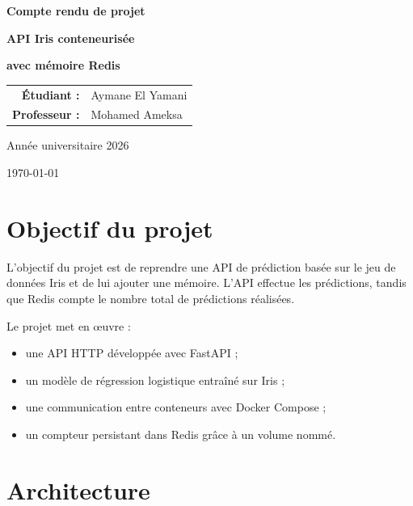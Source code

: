 \documentclass[12pt,a4paper]{article}
\begin{document}
\begin{titlepage}
  \centering
  \vspace*{2cm}

  {\Large\textbf{Compte rendu de projet}\par}
  \vspace{1.5cm}

  {\huge\bfseries API Iris conteneurisée\par}
  \vspace{0.4cm}
  {\huge\bfseries avec mémoire Redis\par}

  \vfill

  \begin{tabular}{rl}
    \textbf{Étudiant :} & Aymane El Yamani \\
    \textbf{Professeur :} & Mohamed Ameksa
  \end{tabular}

  \vfill

  {\large Année universitaire 2026\par}
  \vspace{0.5cm}
  {\large \today\par}
\end{titlepage}

\tableofcontents
\newpage

\section{Objectif du projet}

L'objectif du projet est de reprendre une API de prédiction basée sur le jeu de
données Iris et de lui ajouter une mémoire. L'API effectue les prédictions,
tandis que Redis compte le nombre total de prédictions réalisées.

Le projet met en œuvre :
\begin{itemize}[itemsep=0.2em]
  \item une API HTTP développée avec FastAPI ;
  \item un modèle de régression logistique entraîné sur Iris ;
  \item une communication entre conteneurs avec Docker Compose ;
  \item un compteur persistant dans Redis grâce à un volume nommé.
\end{itemize}

\section{Architecture}
\end{document}
